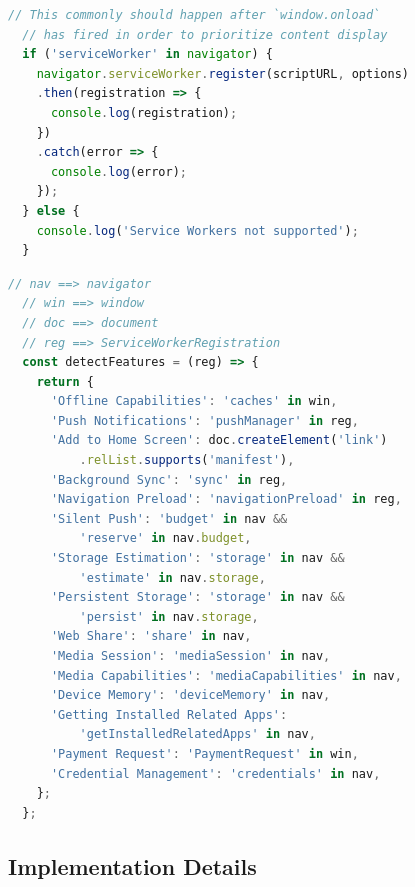 \documentclass[sigconf]{acmart}
\begin{document}
\begin{lstlisting}[caption={Checking for Service Worker support.},
  label=code:sw-supported, language=JavaScript, float=t] 
  // This commonly should happen after `window.onload`
  // has fired in order to prioritize content display
  if ('serviceWorker' in navigator) { 
    navigator.serviceWorker.register(scriptURL, options)
    .then(registration => {
      console.log(registration);
    })
    .catch(error => {
      console.log(error);
    });
  } else {
    console.log('Service Workers not supported');
  }
\end{lstlisting}

\begin{lstlisting}[caption={Feature detection of various \textsc{pwa} features.},
  label=code:feature-detection, language=JavaScript, float=t] 
  // nav ==> navigator
  // win ==> window
  // doc ==> document
  // reg ==> ServiceWorkerRegistration
  const detectFeatures = (reg) => {
    return {
      'Offline Capabilities': 'caches' in win,
      'Push Notifications': 'pushManager' in reg,
      'Add to Home Screen': doc.createElement('link')
          .relList.supports('manifest'),
      'Background Sync': 'sync' in reg,
      'Navigation Preload': 'navigationPreload' in reg,
      'Silent Push': 'budget' in nav &&
          'reserve' in nav.budget,
      'Storage Estimation': 'storage' in nav &&
          'estimate' in nav.storage,
      'Persistent Storage': 'storage' in nav &&
          'persist' in nav.storage,
      'Web Share': 'share' in nav,
      'Media Session': 'mediaSession' in nav,
      'Media Capabilities': 'mediaCapabilities' in nav,
      'Device Memory': 'deviceMemory' in nav,
      'Getting Installed Related Apps':
          'getInstalledRelatedApps' in nav,
      'Payment Request': 'PaymentRequest' in win,
      'Credential Management': 'credentials' in nav,
    };
  };    
\end{lstlisting}  

\subsection{Implementation Details}
\end{document}
